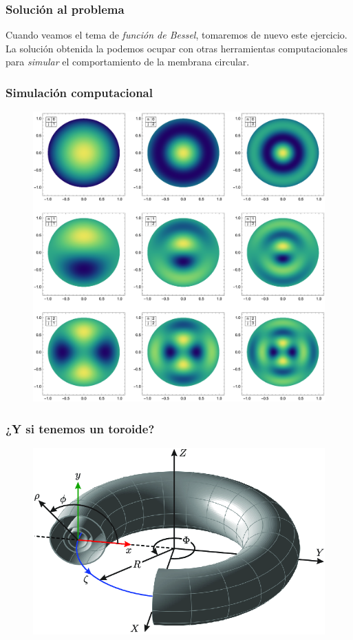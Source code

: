 \documentclass[12pt]{beamer}
\begin{document}
\begin{frame}
\frametitle{Solución al problema}
Cuando veamos el tema de \emph{función de Bessel}, tomaremos de nuevo este ejercicio.
\\
\bigskip
\pause
La solución obtenida la podemos ocupar con otras herramientas computacionales para \emph{simular} el comportamiento de la membrana circular.
\end{frame}
\begin{frame}
\frametitle{Simulación computacional}
\begin{figure}[h!]
    \centering
    \includegraphics[scale=0.32]{Imagenes/Modos_Vibracion_Membrana_Circular_01.eps}
\end{figure}
\end{frame}
\begin{frame}
\frametitle{¿Y si tenemos un toroide?}
\begin{figure}
    \centering
    \includegraphics[scale=0.4]{Imagenes/Geometria_Toro.png}
\end{figure}
\end{frame}
\end{document}
